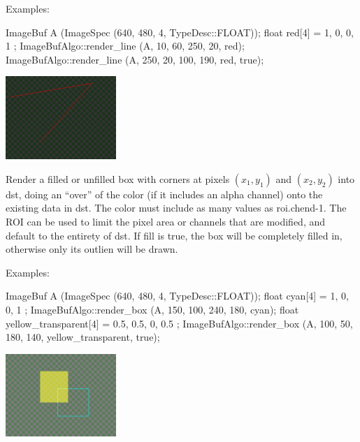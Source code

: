 \smallskip
\noindent Examples:
\begin{code}
    ImageBuf A (ImageSpec (640, 480, 4, TypeDesc::FLOAT));
    float red[4] = { 1, 0, 0, 1 };
    ImageBufAlgo::render_line (A, 10, 60, 250, 20, red);
    ImageBufAlgo::render_line (A, 250, 20, 100, 190, red, true);
\end{code}

\spc \includegraphics[width=1.65in]{figures/lines.png}  \\
\apiend


 
\NEW %

Render a filled or unfilled box with corners at pixels $(x_1,y_1)$ and
$(x_2,y_2)$ into {\cf dst}, doing an ``over'' of the color (if it includes
an alpha channel) onto the existing data in {\cf dst}. The {\cf color} must
include as many values as {\cf roi.chend-1}. The ROI can be used to limit
the pixel area or channels that are modified, and default to the entirety of
{\cf dst}. If {\cf fill} is {\cf true}, the box will be completely filled in,
otherwise only its outlien will be drawn.

\smallskip
\noindent Examples:
\begin{code}
    ImageBuf A (ImageSpec (640, 480, 4, TypeDesc::FLOAT));
    float cyan[4] = { 1, 0, 0, 1 };
    ImageBufAlgo::render_box (A, 150, 100, 240, 180, cyan);
    float yellow_transparent[4] = { 0.5, 0.5, 0, 0.5 };
    ImageBufAlgo::render_box (A, 100, 50, 180, 140, yellow_transparent, true);
\end{code}

\spc \includegraphics[width=1.65in]{figures/box.png}  \\
\apiend


